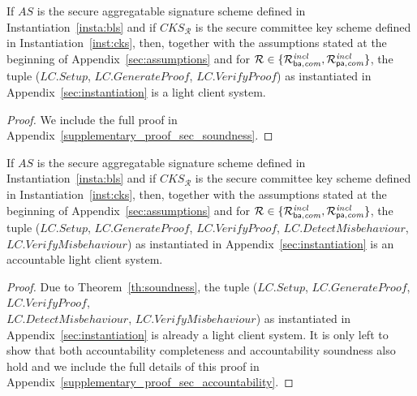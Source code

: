 \begin{theorem}
\label{th:soundness} 
If $\mathit{AS}$ is the secure aggregatable signature scheme defined in Instantiation~\ref{insta:bls} and if 
$\mathit{CKS_{\mathcal{R}}}$ is the secure committee key scheme defined in Instantiation~\ref{inst:cks}, then, together with 
the assumptions stated at the beginning of Appendix~\ref{sec:assumptions} and for $\mathcal{R} \in \{ \mathcal{R}^{\mathit{incl}}_{\mathsf{ba},\mathit{com}}, \mathcal{R}^{\mathit{incl}}_{\mathsf{pa},\mathit{com}} \}$, the tuple 
($\mathit{LC.Setup}$, $\mathit{LC.GenerateProof}$, $\mathit{LC.VerifyProof}$) as instantiated in Appendix~\ref{sec:instantiation} is a light client system.
\end{theorem}



\begin{proof} 
We include the full proof in Appendix~\ref{supplementary_proof_sec_soundness}.   
\end{proof}

\begin{theorem} 
\label{th:accountability_results}
If $\mathit{AS}$ is the secure aggregatable signature scheme defined in Instantiation~\ref{insta:bls} and if 
$\mathit{CKS_{\mathcal{R}}}$ is the secure committee key scheme defined in Instantiation~\ref{inst:cks}, then, together 
with the assumptions stated at the beginning of Appendix~\ref{sec:assumptions} and for $\mathcal{R} \in \{ \mathcal{R}^{\mathit{incl}}_{\mathsf{ba},\mathit{com}}, \mathcal{R}^{\mathit{incl}}_{\mathsf{pa},\mathit{com}} \}$, the tuple 
($\mathit{LC.Setup}$, $\mathit{LC.GenerateProof}$, $\mathit{LC.VerifyProof}$, $\mathit{LC.DetectMisbehaviour}$, 
$\mathit{LC.VerifyMisbehaviour}$) as instantiated in Appendix~\ref{sec:instantiation} is an accountable light client system.
\end{theorem}
\begin{proof}
\noindent Due to Theorem~\ref{th:soundness}, the tuple 
($\mathit{LC.Setup}$, $\mathit{LC.GenerateProof}$, $\mathit{LC.VerifyProof}$, \\ $\mathit{LC.DetectMisbehaviour}$, 
$\mathit{LC.VerifyMisbehaviour}$) as instantiated in Appendix~\ref{sec:instantiation} is already a light client system. 
It is only left to show that both accountability completeness and accountability soundness also hold and we include the full details of this proof in 
Appendix~\ref{supplementary_proof_sec_accountability}.   
\end{proof}

